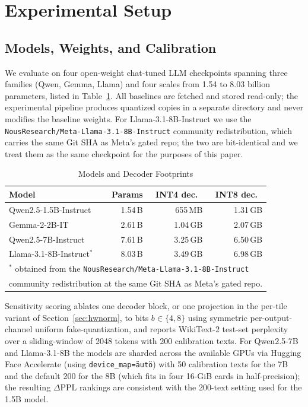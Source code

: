 \documentclass{ieeeaccess}
\begin{document}
\section{Experimental Setup}
\label{sec:setup}

\subsection{Models, Weights, and Calibration}
We evaluate on four open-weight chat-tuned LLM checkpoints spanning
three families (Qwen, Gemma, Llama) and four scales from 1.54 to 8.03
billion parameters, listed in Table~\ref{tab:models}. All baselines are
fetched and stored read-only; the experimental pipeline produces
quantized copies in a separate directory and never modifies the
baseline weights. For Llama-3.1-8B-Instruct we use the
\texttt{NousResearch/Meta-Llama-3.1-8B-Instruct} community
redistribution, which carries the same Git SHA as Meta's gated repo;
the two are bit-identical and we treat them as the same checkpoint for
the purposes of this paper.

\begin{table}[t]
\caption{Models and Decoder Footprints}
\label{tab:models}
\centering
\begin{tabular}{lrrr}
\toprule
Model & Params & INT4 dec.\ & INT8 dec.\ \\
\midrule
Qwen2.5-1.5B-Instruct      & 1.54\,B & 655\,MB & 1.31\,GB \\
Gemma-2-2B-IT              & 2.61\,B & 1.04\,GB & 2.07\,GB \\
Qwen2.5-7B-Instruct        & 7.61\,B & 3.25\,GB & 6.50\,GB \\
Llama-3.1-8B-Instruct$^*$  & 8.03\,B & 3.49\,GB & 6.98\,GB \\
\bottomrule
\multicolumn{4}{l}{\footnotesize $^*$ obtained from the
\texttt{NousResearch/Meta-Llama-3.1-8B-Instruct}}\\
\multicolumn{4}{l}{\footnotesize \phantom{$^*$} community redistribution
at the same Git SHA as Meta's gated repo.}
\end{tabular}
\end{table}

Sensitivity scoring ablates one decoder block, or one projection in the
per-tile variant of Section~\ref{sec:hwnorm}, to bits
$b \in \{4, 8\}$ using symmetric per-output-channel uniform
fake-quantization, and reports WikiText-2 test-set perplexity over a
sliding-window of 2048 tokens with 200 calibration texts. For
Qwen2.5-7B and Llama-3.1-8B the models are sharded across the
available GPUs via Hugging Face Accelerate \cite{accelerate} (using
\texttt{device\_map=\"auto\"}) with 50 calibration texts for the 7B and
the default 200 for the 8B (which fits in four 16-GiB cards in
half-precision); the resulting $\Delta\mathrm{PPL}$ rankings are
consistent with the 200-text setting used for the 1.5B model.
\end{document}
